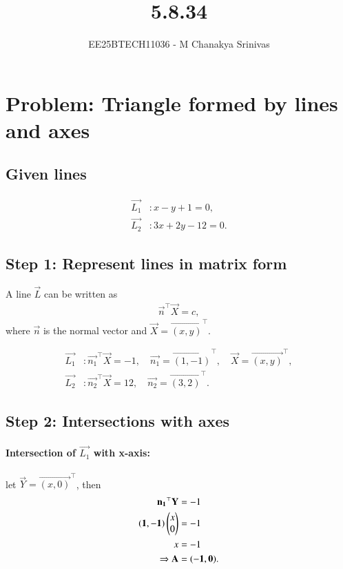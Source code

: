 \documentclass[journal]{IEEEtran}
\begin{document}

\vspace{3cm}

\title{5.8.34}
\author{EE25BTECH11036 - M Chanakya Srinivas}
\maketitle

\renewcommand{\thetable}{\theenumi}
\setlength{\intextsep}{10pt}
\renewcommand\theequation{\arabic{equation}}


\section*{Problem: Triangle formed by lines and axes}

\subsection*{Given lines}
\begin{align}
\vec{L_1} &: x - y + 1 = 0, \label{eq:L1}\\
\vec{L_2} &: 3x + 2y - 12 = 0. \label{eq:L2}
\end{align}

\subsection*{Step 1: Represent lines in matrix form}

A line $\vec{L}$ can be written as
\begin{align}
\vec{n}^\top \vec{X} = c, 
\end{align}
where $\vec{n}$ is the normal vector and $\vec{X} = \vec{(x,y)}^\top$.

\begin{align}
\vec{L_1} &: \vec{n_1}^\top \vec{X} = -1, \quad \vec{n_1} = \vec{(1,-1)}^\top, \quad \vec{X} = \vec{(x,y)}^\top, \\
\vec{L_2} &: \vec{n_2}^\top \vec{X} = 12, \quad \vec{n_2} = \vec{(3,2)}^\top. 
\end{align}

\subsection*{Step 2: Intersections with axes}

\paragraph{Intersection of $\vec{L_1}$ with x-axis:} let $\vec{Y} = \vec{(x,0)}^\top$, then
\begin{align}
\mathbf{n_1}^\top \mathbf{Y} &= -1 \notag\\
\mathbf{(1,-1)} \begin{pmatrix}x\\0\end{pmatrix} &= -1 \notag\\
x &= -1 \notag\\
\Rightarrow \mathbf{A} &= \mathbf{(-1,0)}. 
\end{align}
\end{document}
